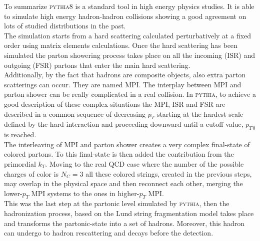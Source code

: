 To summarize \textsc{pythia8} is a standard tool in high energy physics studies. It is able to simulate high energy hadron-hadron collisions showing a good agreement on lots of studied distributions in the past. 
\\
The simulation starts from a hard scattering calculated perturbatively at a fixed order using matrix elements calculations. Once the hard scattering has been simulated the parton showering process takes place on all the incoming (ISR) and outgoing (FSR) partons that enter the main hard scattering. 
\\
Additionally, by the fact that hadrons are composite objects, also extra parton scatterings can occur. They are named MPI. The interplay between MPI and parton shower can be really complicated in a real collision. In \textsc{pythia}, to achieve a good description of these complex situations the MPI, ISR and FSR are described in a common sequence of decreasing $p_T$ starting at the hardest scale defined by the hard interaction and proceeding downward until a cutoff value, $p_{T\,0}$ is reached.
\\
The interleaving of MPI and parton shower creates a very complex final-state of colored partons.
To this final-state is then added the contribution from the primordial $k_T$.
Moving to the real QCD case where the number of the possible charges of color is $N_C=3$ all these colored strings, created in the previous steps, may overlap in the physical space and then reconnect each other, merging the lower-$p_T$ MPI systems to the ones in higher-$p_T$ MPI.   
\\
This was the last step at the partonic level simulated by \textsc{pythia}, then the hadronization process, based on the Lund string fragmentation model takes place and transforms the partonic-state into a set of hadrons. Moreover, this hadron can undergo to hadron rescattering and decays before the detection.


